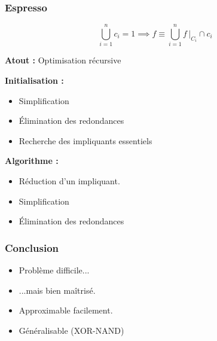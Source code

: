 \documentclass[handout]{beamer}
\begin{document}
\begin{frame}
  \frametitle{Espresso}

  \[ \bigcup_{i=1}^n c_i = 1 \implies f \equiv \bigcup_{i=1}^{n} f\,|_{C_i} \cap c_i \]

  \textbf{Atout :} Optimisation récursive

  \textbf{Initialisation :}
  
  \begin{itemize}
  \item Simplification
  \item Élimination des redondances
  \item Recherche des impliquants essentiels
  \end{itemize}

  \textbf{Algorithme :}
  \begin{itemize}
  \item Réduction d'un impliquant.
  \item Simplification
  \item Élimination des redondances
  \end{itemize}
  
\end{frame}

\begin{frame}
  \frametitle{Conclusion}

  \begin{itemize}
  \item Problème difficile...
  \item ...mais bien maîtrisé.
  \item Approximable facilement.
  \item Généralisable (XOR-NAND)

  \end{itemize}

\end{frame}
\end{document}

